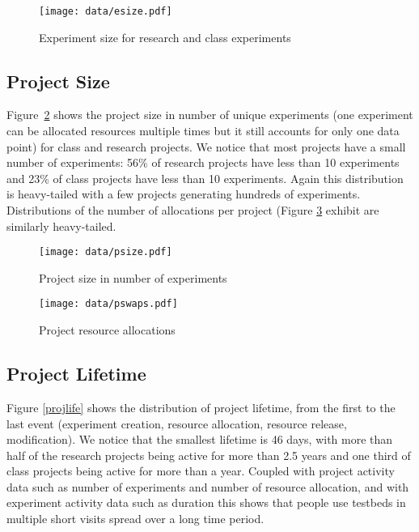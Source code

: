 \documentclass[12pt]{article}
\begin{document}
\begin{figure}[htbp]
\begin{center}
\texttt{[image: data/esize.pdf]}
\caption{Experiment size for research and class experiments}
\label{expsize}
\end{center}
\end{figure}

\subsection*{Project Size}
Figure~\ref{projsize} shows the project size in number of unique
experiments (one experiment can be allocated resources multiple times but it
still accounts for only one data point) for class and research projects.
We notice that most projects have a small number of experiments: 56\% of
research projects have less than 10 experiments and 23\% of class
projects have less than 10 experiments. Again this distribution is
heavy-tailed with a few projects generating hundreds of experiments.
Distributions of the number of allocations per project (Figure
\ref{projswap} exhibit are similarly heavy-tailed.

\begin{figure}[htbp]
\begin{center}
\texttt{[image: data/psize.pdf]}
\caption{Project size in number of experiments}
\label{projsize}
\end{center}
\end{figure}

\begin{figure}[htbp]
\begin{center}
\texttt{[image: data/pswaps.pdf]}
\caption{Project resource allocations}
\label{projswap}
\end{center}
\end{figure}


\subsection*{Project Lifetime}
Figure \ref{projlife} shows the distribution of project lifetime,
from the first to the last event (experiment creation, resource allocation, resource release, modification). We notice that the smallest lifetime is 46 days,
with more than half of the research projects being active for more than
2.5 years and one third of class projects being active for more than a
year. Coupled with project activity data such as number of experiments
and number of resource allocation, and with experiment activity data such as
duration this shows that people use testbeds in multiple short visits
spread over a long time period.
\end{document}
